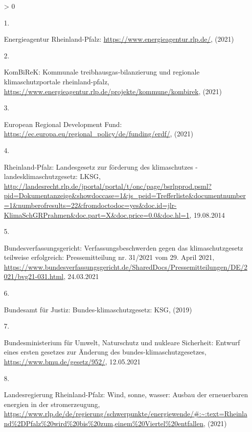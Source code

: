 \documentclass[a4paper,11pt]{article}
\newlength{\cslhangindent}
\newlength{\csllabelwidth}
\newenvironment{CSLReferences}[3] %
 {%
  \setlength{\parindent}{0pt}
  \ifodd #1 \everypar{\setlength{\hangindent}{\cslhangindent}}\ignorespaces\fi
  \ifnum #2 > 0
  \setlength{\parskip}{#2\baselineskip}
  \fi
 }%
 {}
\newcommand{\CSLLeftMargin}[1]{\parbox[t]{\maxof{\widthof{#1}}{\csllabelwidth}}{#1}}
\newcommand{\CSLRightInline}[1]{\parbox[t]{\linewidth}{#1}}
\begin{document}
\noindent

\setlength{\parindent}{-0.5cm}
\setlength{\leftskip}{0.5cm}
\setlength{\parskip}{8pt}

\hypertarget{refs}{}
\begin{CSLReferences}{0}{0}
\leavevmode\hypertarget{ref-EnergieagenturRheinlandPfalz.2021}{}%
\CSLLeftMargin{1. }
\CSLRightInline{Energieagentur Rheinland-Pfalz: \url{https://www.energieagentur.rlp.de/}, (2021)}

\leavevmode\hypertarget{ref-KomBiReK.2021}{}%
\CSLLeftMargin{2. }
\CSLRightInline{KomBiReK: Kommunale treibhausgas-bilanzierung und regionale klimaschutzportale rheinland-pfalz, \url{https://www.energieagentur.rlp.de/projekte/kommune/kombirek}, (2021)}

\leavevmode\hypertarget{ref-EuropeanRegionalDevelopmentFund.2021}{}%
\CSLLeftMargin{3. }
\CSLRightInline{European Regional Development Fund: \url{https://ec.europa.eu/regional_policy/de/funding/erdf/}, (2021)}

\leavevmode\hypertarget{ref-RheinlandPfalz.19.08.2014}{}%
\CSLLeftMargin{4. }
\CSLRightInline{Rheinland-Pfalz: Landesgesetz zur f{ö}rderung des klimaschutzes - landesklimaschutzgesetz: LKSG, \url{http://landesrecht.rlp.de/jportal/portal/t/onc/page/bsrlpprod.psml?pid=Dokumentanzeige\&showdoccase=1\&js_peid=Trefferliste\&documentnumber=1\&numberofresults=22\&fromdoctodoc=yes\&doc.id=jlr-KlimaSchGRPrahmen\&doc.part=X\&doc.price=0.0\&doc.hl=1}, 19.08.2014}

\leavevmode\hypertarget{ref-Bundesverfassungsgericht.24.03.2021}{}%
\CSLLeftMargin{5. }
\CSLRightInline{Bundesverfassungsgericht: Verfassungsbeschwerden gegen das klimaschutzgesetz teilweise erfolgreich: Pressemitteilung nr. 31/2021 vom 29. April 2021, \url{https://www.bundesverfassungsgericht.de/SharedDocs/Pressemitteilungen/DE/2021/bvg21-031.html}, 24.03.2021}

\leavevmode\hypertarget{ref-BundesamtfurJustiz.2019}{}%
\CSLLeftMargin{6. }
\CSLRightInline{Bundesamt für Justiz: Bundes-klimaschutzgesetz: KSG, (2019)}

\leavevmode\hypertarget{ref-BundesministeriumfurUmweltNaturschutzundnukleareSicherheit.12.05.2021}{}%
\CSLLeftMargin{7. }
\CSLRightInline{Bundesministerium für Umwelt, Naturschutz und nukleare Sicherheit: Entwurf eines ersten gesetzes zur {Ä}nderung des bundes-klimaschutzgesetzes, \url{https://www.bmu.de/gesetz/952/}, 12.05.2021}

\leavevmode\hypertarget{ref-LandesregierungRheinlandPfalz.2021}{}%
\CSLLeftMargin{8. }
\CSLRightInline{Landesregierung Rheinland-Pfalz: Wind, sonne, wasser: Ausbau der erneuerbaren energien in der stromerzeugung, \url{https://www.rlp.de/de/regierung/schwerpunkte/energiewende/\#:~:text=Rheinland\%2DPfalz\%20wird\%20bis\%20zum,einem\%20Viertel\%20entfallen}, (2021)}


\end{CSLReferences}
\end{document}
